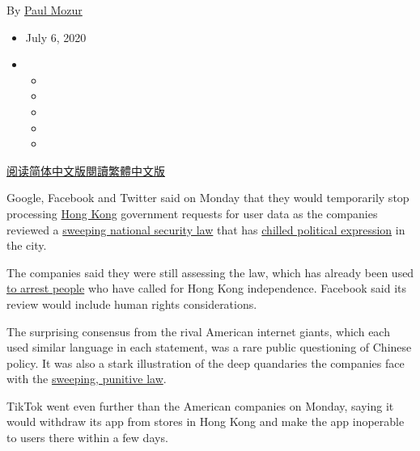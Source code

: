 By \href{https://www.nytimes.com/by/paul-mozur}{Paul Mozur}

\begin{itemize}
\item
  July 6, 2020
\item
  \begin{itemize}
  \item
  \item
  \item
  \item
  \item
  \end{itemize}
\end{itemize}

\href{https://cn.nytimes.com/technology/20200707/facebook-temporarily-stops-hong-kong-data-requests/}{阅读简体中文版}\href{https://cn.nytimes.com/technology/20200707/facebook-temporarily-stops-hong-kong-data-requests/zh-hant/}{閱讀繁體中文版}

Google, Facebook and Twitter said on Monday that they would temporarily
stop processing
\href{https://www.nytimes.com/2020/07/20/world/asia/hong-kong-coronavirus.html}{Hong
Kong} government requests for user data as the companies reviewed a
\href{https://www.nytimes.com/2020/06/30/world/asia/hong-kong-security-law-explain.html}{sweeping
national security law} that has
\href{https://www.nytimes.com/2020/07/01/world/hong-kong-security-law-fear.html?action=click\&module=Top\%20Stories\&pgtype=Homepage}{chilled
political expression} in the city.

The companies said they were still assessing the law, which has already
been used
\href{https://www.nytimes.com/2020/07/01/world/asia/hong-kong-security-law-china.html?campaign_id=2\&emc=edit_th_20200702\&instance_id=19898\&nl=todaysheadlines\&regi_id=69893020\&segment_id=32410\&user_id=82de9857359202789a14fd0cdfbc6442}{to
arrest people} who have called for Hong Kong independence. Facebook said
its review would include human rights considerations.

The surprising consensus from the rival American internet giants, which
each used similar language in each statement, was a rare public
questioning of Chinese policy. It was also a stark illustration of the
deep quandaries the companies face with the
\href{https://www.nytimes.com/2020/07/07/business/hong-kong-security-law-tech.html}{sweeping,
punitive law}.

TikTok went even further than the American companies on Monday, saying
it would withdraw its app from stores in Hong Kong and make the app
inoperable to users there within a few days.

